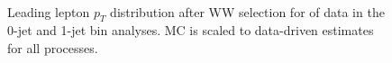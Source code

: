 \begin{figure}[!hbtp]
\centering
{}
\\
\caption{Leading lepton $p_T$ distribution after WW selection for \intlumiEightTeV of data 
in the 0-jet  and 1-jet  bin analyses. 
MC is scaled to data-driven estimates for all processes.}
\label{fig:ww_ptmax}
\end{figure}

